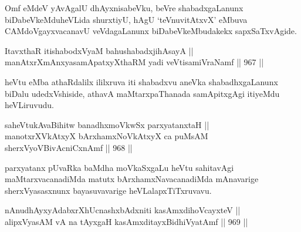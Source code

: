 
\begin{artha}
Omf eMdeV yAvAgalU dhAyxnisabeVku, beVre shabadxgaLanunx biDabeVkeMduheVLida shurxtiyU, hAgU `teV\s nuvitAtxvX' eMbuva CAMdoVgayxvacanavU veVdagaLanunx biDabeVkeMbudakekx sapxSaTxvAgide.
\end{artha}


\begin{shl}
ItavxthaR itishabodxV\s yaM bahushabadxjihAsayA || \\
manAtxrXmAnxyasamApatxyXthaRM yadi veVtisamiVraNamf ||  967 ||  
\end{shl}

\begin{artha}
heVtu eMba athaRdalilx ililxruva iti shabadxvu aneVka shabadhxgaLanunx biDalu udedxVshiside, athavA maMtarxpaThanada samApitxgAgi itiyeMdu heVLiruvudu.
\end{artha}


\begin{shl}
saheVtukAvaBihitw banadhxmoVkwSx parxyatanxtaH || \\
\footnotemark[1]manotxrXVkAtxyX bArxhamxNoVkAtxyX ca puMsAM sherxVyoVBivAcniCxnAmf ||  968 ||  
\end{shl}

\begin{artha}
parxyatanx pUvaRka baMdha moVkaSxgaLu heVtu sahitavAgi maMtarxvacanadiMda matutx bArxhamxNavacanadiMda mAnavarige sherxVyasasxnunx bayasuvavarige heVLalapxTiTxruvavu.
\end{artha}


\begin{shl}
nAnudhAyxyAdabxrXhUcnashxbAdxniti kasAmxdihoVcayxteV || \\
alipxVyasAM vA na tAyxgaH kasAmxditayxBidhiVyatAmf ||  969 ||  
\end{shl}

